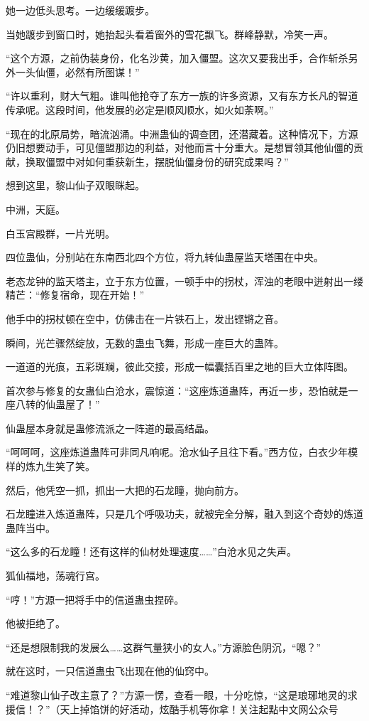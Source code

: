 \begin{this_body}
她一边低头思考。一边缓缓踱步。

当她踱步到窗口时，她抬起头看着窗外的雪花飘飞。群峰静默，冷笑一声。

“这个方源，之前伪装身份，化名沙黄，加入僵盟。这次又要我出手，合作斩杀另外一头仙僵，必然有所图谋！”

“许以重利，财大气粗。谁叫他抢夺了东方一族的许多资源，又有东方长凡的智道传承呢。这段时间，他发展的必定是顺风顺水，如火如荼啊。”

“现在的北原局势，暗流汹涌。中洲蛊仙的调查团，还潜藏着。这种情况下，方源仍旧想要动手，可见僵盟那边的利益，对他而言十分重大。是想冒领其他仙僵的贡献，换取僵盟中对如何重获新生，摆脱仙僵身份的研究成果吗？”

想到这里，黎山仙子双眼眯起。

中洲，天庭。

白玉宫殿群，一片光明。

四位蛊仙，分别站在东南西北四个方位，将九转仙蛊屋监天塔围在中央。

老态龙钟的监天塔主，立于东方位置，一顿手中的拐杖，浑浊的老眼中迸射出一缕精芒：“修复宿命，现在开始！”

他手中的拐杖顿在空中，仿佛击在一片铁石上，发出铿锵之音。

瞬间，光芒骤然绽放，无数的蛊虫飞舞，形成一座巨大的蛊阵。

一道道的光痕，五彩斑斓，彼此交接，形成一幅囊括百里之地的巨大立体阵图。

首次参与修复的女蛊仙白沧水，震惊道：“这座炼道蛊阵，再近一步，恐怕就是一座八转的仙蛊屋了！”

仙蛊屋本身就是蛊修流派之一阵道的最高结晶。

“呵呵呵，这座炼道蛊阵可非同凡响呢。沧水仙子且往下看。”西方位，白衣少年模样的炼九生笑了笑。

然后，他凭空一抓，抓出一大把的石龙瞳，抛向前方。

石龙瞳进入炼道蛊阵，只是几个呼吸功夫，就被完全分解，融入到这个奇妙的炼道蛊阵当中。

“这么多的石龙瞳！还有这样的仙材处理速度……”白沧水见之失声。

狐仙福地，荡魂行宫。

“哼！”方源一把将手中的信道蛊虫捏碎。

他被拒绝了。

“还是想限制我的发展么……这群气量狭小的女人。”方源脸色阴沉，“嗯？”

就在这时，一只信道蛊虫飞出现在他的仙窍中。

“难道黎山仙子改主意了？”方源一愣，查看一眼，十分吃惊，“这是琅琊地灵的求援信！？”（天上掉馅饼的好活动，炫酷手机等你拿！关注起點中文网公众号

\end{this_body}

